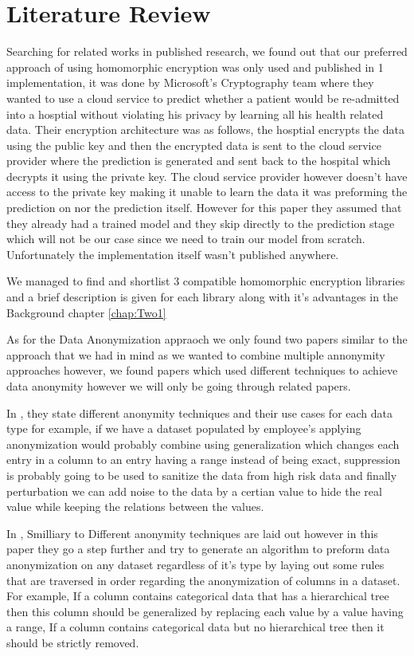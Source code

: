 \chapter{Literature Review}
\label{chap:Three}
  
Searching for related works in published research, we found out that our preferred approach of using homomorphic encryption was only used and published in 1 implementation\cite{gilad2016cryptonets},
it was done by Microsoft's Cryptography team where they wanted to use a cloud service to predict whether a patient would be re-admitted into a hosptial
without violating his privacy by learning all his health related data. Their encryption architecture was as follows, the hosptial encrypts the data using the public key and then the encrypted data is sent to the cloud service provider where the prediction is generated and sent back to the hospital which decrypts it using the private key.
The cloud service provider however doesn't have access to the private key making it unable to learn the data it was preforming the prediction on nor the prediction itself. However for this paper they assumed that they already had a trained model and they skip directly to the prediction stage which will not be our case since
we need to train our model from scratch. Unfortunately the implementation itself wasn't published anywhere.\par
We managed to find and shortlist 3 compatible homomorphic encryption libraries and a brief description is given for each library along with it's advantages in the Background chapter \ref{chap:Two1}

As for the Data Anonymization appraoch we only found two papers \cite{cormode2009anonymized,fung2007anonymizing} similar to the approach that we had in mind as we wanted to combine multiple annonymity approaches however, we found papers which used different techniques to achieve data anonymity \cite{bayardo2005data,terrovitis2008privacy} however we will only be going through related papers.\par
In \cite{cormode2009anonymized}, they state different anonymity techniques and their use cases for each data type for example, if we have a dataset populated by employee's applying anonymization would probably combine using generalization which changes each entry in a column to an entry having a range instead of being exact, suppression is probably going to be used to sanitize the data from high
risk data and finally perturbation we can add noise to the data by a certian value to hide the real value while keeping the relations between the values.\par
In \cite{fung2007anonymizing}, Smilliary to \cite{cormode2009anonymized} Different anonymity techniques are laid out however in this paper they go a step further and try to generate an algorithm to preform data anonymization on any dataset regardless of it's type by laying out some rules that are traversed in order regarding the anonymization of columns in a dataset.
For example, If a column contains categorical data that has a hierarchical tree then this column should be generalized by replacing each value by a value having a range, If a column contains categorical data but no hierarchical tree then it should be strictly removed. 

